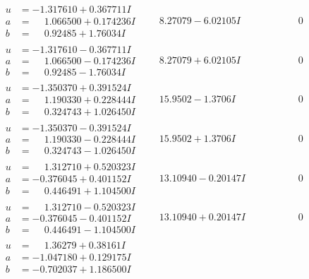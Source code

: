 \documentclass[1p]{elsarticle_modified}
\theoremstyle{definition}
\begin{document}
$$\begin{array}{c|c|c}
\begin{aligned}
u &= -1.317610 + 0.367711 I \\
a &= \phantom{-}1.066500 + 0.174236 I \\
b &= \phantom{-}0.92485 + 1.76034 I\end{aligned}
 & \phantom{-}8.27079 - 6.02105 I & \phantom{-0.000000 } 0 \\ \hline\begin{aligned}
u &= -1.317610 - 0.367711 I \\
a &= \phantom{-}1.066500 - 0.174236 I \\
b &= \phantom{-}0.92485 - 1.76034 I\end{aligned}
 & \phantom{-}8.27079 + 6.02105 I & \phantom{-0.000000 } 0 \\ \hline\begin{aligned}
u &= -1.350370 + 0.391524 I \\
a &= \phantom{-}1.190330 + 0.228444 I \\
b &= \phantom{-}0.324743 + 1.026450 I\end{aligned}
 & \phantom{-}15.9502 - 1.3706 I & \phantom{-0.000000 } 0 \\ \hline\begin{aligned}
u &= -1.350370 - 0.391524 I \\
a &= \phantom{-}1.190330 - 0.228444 I \\
b &= \phantom{-}0.324743 - 1.026450 I\end{aligned}
 & \phantom{-}15.9502 + 1.3706 I & \phantom{-0.000000 } 0 \\ \hline\begin{aligned}
u &= \phantom{-}1.312710 + 0.520323 I \\
a &= -0.376045 + 0.401152 I \\
b &= \phantom{-}0.446491 + 1.104500 I\end{aligned}
 & \phantom{-}13.10940 - 0.20147 I & \phantom{-0.000000 } 0 \\ \hline\begin{aligned}
u &= \phantom{-}1.312710 - 0.520323 I \\
a &= -0.376045 - 0.401152 I \\
b &= \phantom{-}0.446491 - 1.104500 I\end{aligned}
 & \phantom{-}13.10940 + 0.20147 I & \phantom{-0.000000 } 0 \\ \hline\begin{aligned}
u &= \phantom{-}1.36279 + 0.38161 I \\
a &= -1.047180 + 0.129175 I \\
b &= -0.702037 + 1.186500 I\end{aligned}

\end{array}$$
\end{document}
